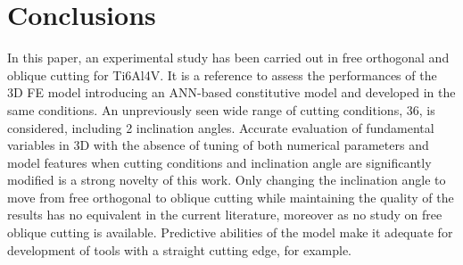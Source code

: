 \documentclass[final,5p,times,twocolumn]{elsarticle}
\begin{document}
\section{Conclusions}

In this paper, an experimental study has been carried out in free orthogonal and oblique cutting for Ti6Al4V. It is a reference to assess the performances of the 3D FE model introducing an ANN-based constitutive model and developed in the same conditions. An unpreviously seen wide range of cutting conditions, 36, is considered, including 2 inclination angles.
Accurate evaluation of fundamental variables in 3D with the absence of tuning of both numerical parameters and model features when cutting conditions and inclination angle are significantly modified is a strong novelty of this work. Only changing the inclination angle to move from free orthogonal to oblique cutting while maintaining the quality of the results has no equivalent in the current literature, moreover as no study on free oblique cutting is available. Predictive abilities of the model make it adequate for development of tools with a straight cutting edge, for example.

%
%
%
%


%
%
%
%


%
%
%
\end{document}
